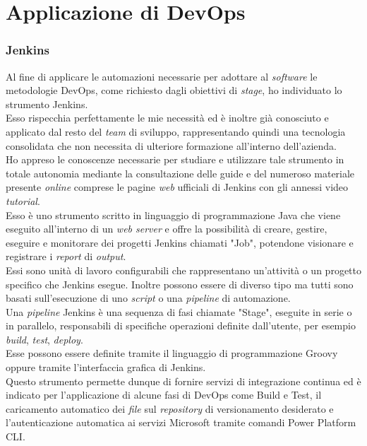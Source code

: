 \section{Applicazione di DevOps}%

\subsubsection*{Jenkins}
Al fine di applicare le automazioni necessarie per adottare al \emph{software} le metodologie \gls{DevOps}, come richiesto dagli obiettivi di \emph{stage}, ho individuato lo strumento Jenkins.\\
Esso rispecchia perfettamente le mie necessità ed è inoltre già conosciuto e applicato dal resto del \emph{team} di sviluppo, rappresentando quindi una tecnologia consolidata che non necessita di ulteriore formazione all'interno dell'azienda.\\
Ho appreso le conoscenze necessarie per studiare e utilizzare tale strumento in totale autonomia mediante la consultazione delle guide e del numeroso materiale presente \emph{online} comprese le pagine \emph{web} ufficiali di Jenkins con gli annessi video \emph{tutorial}.\\
Esso è uno strumento scritto in linguaggio di programmazione Java che viene eseguito all'interno di un \emph{web server} e offre la possibilità di creare, gestire, eseguire e monitorare dei progetti Jenkins chiamati "Job", potendone visionare e registrare i \emph{report} di \emph{output}.\\
Essi sono unità di lavoro configurabili che rappresentano un'attività o un progetto specifico che Jenkins esegue. Inoltre possono essere di diverso tipo ma tutti sono basati sull'esecuzione di uno \emph{script} o una \emph{pipeline} di automazione.\\
Una \emph{pipeline} Jenkins è una sequenza di fasi chiamate "Stage", eseguite in serie o in parallelo, responsabili di specifiche operazioni definite dall'utente, per esempio \emph{build}, \emph{test}, \emph{deploy}.\\
Esse possono essere definite tramite il linguaggio di programmazione Groovy oppure tramite l'interfaccia grafica di Jenkins.\\
Questo strumento permette dunque di fornire servizi di integrazione continua ed è indicato per l'applicazione di alcune fasi di \gls{DevOps} come Build e Test, il caricamento automatico dei \emph{file} sul \emph{repository} di versionamento desiderato e l'autenticazione automatica ai servizi Microsoft tramite comandi Power Platform CLI.\\

